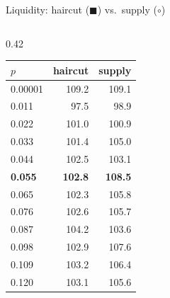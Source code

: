 \documentclass[aspectratio=169,10pt]{beamer}
\begin{document}
\begin{frame}{Liquidity: haircut ($\blacksquare$) vs.\ supply ($\circ$)}
\begin{columns}[T]
\begin{column}{0.42\textwidth}
\begin{tabular}{lrr}
        \toprule
        $p$ & haircut & supply \\
        \midrule
        0.00001 & 109.2 & 109.1 \\
        0.011 & 97.5 & 98.9 \\
        0.022 & 101.0 & 100.9 \\
        0.033 & 101.4 & 105.0 \\
        0.044 & 102.5 & 103.1 \\
        \textbf{0.055} & \textbf{102.8} & \textbf{108.5} \\
        0.065 & 102.3 & 105.8 \\
        0.076 & 102.6 & 105.7 \\
        0.087 & 104.2 & 103.6 \\
        0.098 & 102.9 & 107.6 \\
        0.109 & 103.2 & 106.4 \\
        0.120 & 103.1 & 105.6 \\
        \bottomrule
      \end{tabular}
    \end{column}
  \end{columns}
\end{frame}
\end{document}
